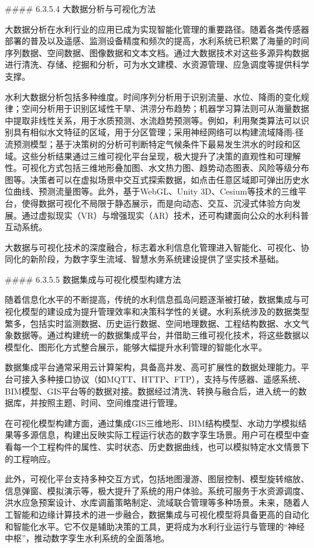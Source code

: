 \#\#\#\# 6.3.5.4 大数据分析与可视化方法

大数据分析在水利行业的应用已成为实现智能化管理的重要路径。随着各类传感器部署的普及以及遥感、监测设备精度和频次的提高，水利系统已积累了海量的时间序列数据、空间数据、图像数据和文本文档。通过大数据技术对这些多源异构数据进行清洗、存储、挖掘和分析，可为水文建模、水资源管理、应急调度等提供科学支撑。

水利大数据分析包括多种维度。时间序列分析用于识别流量、水位、降雨的变化规律；空间分析用于识别区域性干旱、洪涝分布趋势；机器学习算法则可从海量数据中提取非线性关系，用于水质预测、水流趋势预测等。例如，利用聚类算法可以识别具有相似水文特征的区域，用于分区管理；采用神经网络可以构建流域降雨-径流预测模型；基于决策树的分析可判断特定气候条件下最易发生洪水的时段和区域。这些分析结果通过三维可视化平台呈现，极大提升了决策的直观性和可理解性。可视化方式包括三维地形叠加图、水文热力图、趋势动态图表、风险等级分布图等。决策者可以在虚拟场景中交互式探索数据，如点击任意区域即可弹出历史水位曲线、预测流量图等。此外，基于WebGL、Unity 3D、Cesium等技术的三维平台，使得数据可视化不局限于静态展示，而是向动态、交互、沉浸式体验方向发展。通过虚拟现实（VR）与增强现实（AR）技术，还可构建面向公众的水利科普互动系统。

大数据与可视化技术的深度融合，标志着水利信息化管理进入智能化、可视化、协同化的新阶段，为数字孪生流域、智慧水务系统建设提供了坚实技术基础。

\#\#\#\# 6.3.5.5 数据集成与可视化模型构建方法

随着信息化水平的不断提高，传统的水利信息孤岛问题逐渐被打破，数据集成与可视化模型的建设成为提升管理效率和决策科学性的关键。水利系统涉及的数据类型繁多，包括实时监测数据、历史运行数据、空间地理数据、工程结构数据、水文气象数据等。通过构建统一的数据集成平台，并借助三维可视化技术，将这些数据以模型化、图形化方式整合展示，能够大幅提升水利管理的智能化水平。

数据集成平台通常采用云计算架构，具备高并发、高可扩展性的数据处理能力。平台可接入多种接口协议（如MQTT、HTTP、FTP），支持与传感器、遥感系统、BIM模型、GIS平台等的数据对接。数据经过清洗、转换与融合后，进入统一的数据库，并按照主题、时间、空间维度进行管理。

在可视化模型构建方面，通过集成GIS三维地形、BIM结构模型、水动力学模拟结果等多源信息，构建出反映实际工程运行状态的数字孪生场景。用户可在模型中查看每一个工程构件的属性、实时状态、历史数据曲线，也可以模拟特定水文情景下的工程响应。

此外，可视化平台支持多种交互方式，包括地图漫游、图层控制、模型旋转缩放、信息弹窗、模拟演示等，极大提升了系统的用户体验。系统可服务于水资源调度、洪水应急预案设计、水库调蓄策略制定、流域联合管理等多种场景。未来，随着人工智能和边缘计算技术的进一步融合，数据集成与可视化模型将具备更高的自动化和智能化水平。它不仅是辅助决策的工具，更将成为水利行业运行与管理的``神经中枢''，推动数字孪生水利系统的全面落地。


